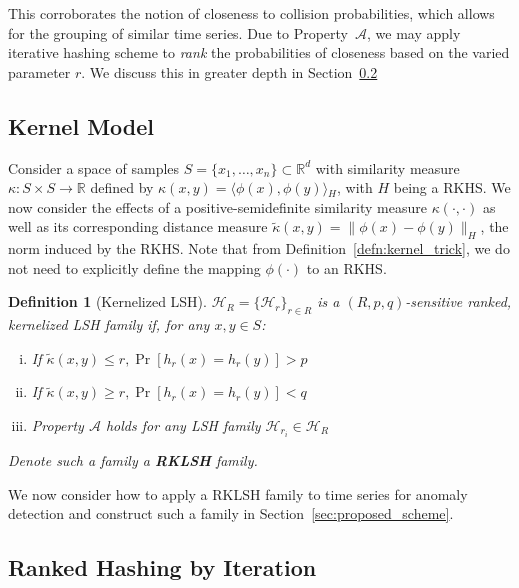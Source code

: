 \documentclass[a4paper]{article}
\newcommand{\innerproduct}[2]{\langle{}#1,#2\rangle{}}
\theoremstyle{def}
\newtheorem{definition}{Definition}
\theoremstyle{thm}
\newcommand{\R}[0]{\mathbb{R}}
\newcommand{\LSH}[0]{\mathcal{H}}
\begin{document}

This corroborates the notion of closeness to collision probabilities, which allows for the grouping of similar time series.
Due to Property~$\mathscr{A}$, we may apply iterative hashing scheme to \textit{rank} the probabilities of closeness based on the varied parameter $r$.
We discuss this in greater depth in Section~\ref{subsec:ranked_lsh}

\subsection{Kernel Model}
\label{subsec:kernel_model}

Consider a space of samples $S = \{x_1,\ldots,x_n\} \subset \R^d$ with similarity measure $\kappa \colon S \times S \rightarrow \R$ defined by $\kappa(x,y) = \innerproduct{\phi(x)}{\phi(y)}_H$, with $H$ being a RKHS.\@
We now consider the effects of a positive-semidefinite similarity measure $\kappa(\cdot, \cdot)$ as well as its corresponding distance measure $\tilde{\kappa}(x,y) = \|\phi(x) - \phi(y)\|_H$, the norm induced by the RKHS.\@
Note that from Definition~\ref{defn:kernel_trick}, we do not need to explicitly define the mapping $\phi(\cdot)$ to an RKHS.\@

\begin{definition}[Kernelized LSH]\label{defn:kernel_lsh}
    ${\LSH}_R = {\{ {\LSH}_r \}}_{r \in R}$ is a $(R, p, q)$-sensitive ranked, kernelized LSH family if, for any $x,y \in S$:
    \begin{enumerate}[(i)]
        \item If $\tilde{\kappa}(x,y) \le r, \Pr[h_r(x) = h_r(y)] > p$
        \item If $\tilde{\kappa}(x,y) \ge r, \Pr[h_r(x) = h_r(y)] < q$
        \item Property $\mathscr{A}$ holds for any LSH family ${\LSH}_{r_i} \in {\LSH}_R$
    \end{enumerate}
    Denote such a family a \textbf{RKLSH} family.
\end{definition}

We now consider how to apply a RKLSH family to time series for anomaly detection and construct such a family in Section~\ref{sec:proposed_scheme}.

\subsection{Ranked Hashing by Iteration}
\label{subsec:ranked_lsh}
\end{document}
